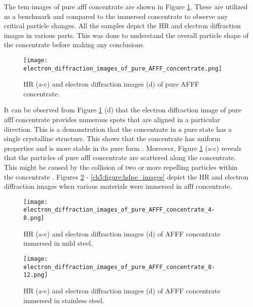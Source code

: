 The \acrshort{tem} images of pure \acrshort{afff} concentrate are shown in Figure \ref{ch5:figure:pure_afff_images}. These are utilized as a benchmark and compared to the immersed concentrate to observe any critical particle changes. All the samples depict the HR and electron diffraction images in various parts. This was done to understand the overall particle shape of the concentrate before making any conclusions.

\begin{figure}[H]
\centering
\texttt{[image: electron\_diffraction\_images\_of\_pure\_AFFF\_concentrate.png]}

\caption{HR (a-c) and electron diffraction images (d) of pure AFFF concentrate.}
\label{ch5:figure:pure_afff_images}
\end{figure}

It can be observed from Figure \ref{ch5:figure:pure_afff_images} (d) that the electron diffraction image of pure \acrshort{afff} concentrate provides numerous spots that are aligned in a particular direction. This is a demonstration that the concentrate in a pure state has a single crystalline structure. This shows that the concentrate has uniform properties and is more stable in its pure form \cite{bandyopadhyay2019fabrication}. Moreover, Figure \ref{ch5:figure:pure_afff_images} (a-c) reveals that the particles of pure \acrshort{afff} concentrate are scattered along the concentrate. This might be caused by the collision of two or more repelling particles within the concentrate \cite{pyrz2008particle}. Figures \ref{ch5:figure:mild_steel_images} - \ref{ch5:figure:hdpe_images} depict the HR and electron diffraction images when various materials were immersed in \acrshort{afff} concentrate. 
  
\begin{figure}[H]
\centering

\texttt{[image: electron\_diffraction\_images\_of\_pure\_AFFF\_concentrate\_4-8.png]}

\caption{HR (a-c) and electron diffraction images (d) of AFFF concentrate immersed in mild steel.}
\label{ch5:figure:mild_steel_images}
\end{figure}

\begin{figure}[H]
\centering

\texttt{[image: electron\_diffraction\_images\_of\_pure\_AFFF\_concentrate\_8-12.png]}

\caption{HR (a-c) and electron diffraction images (d) of AFFF concentrate immersed in stainless steel.}
\label{ch5:figure:stainless_steel_images}
\end{figure}

